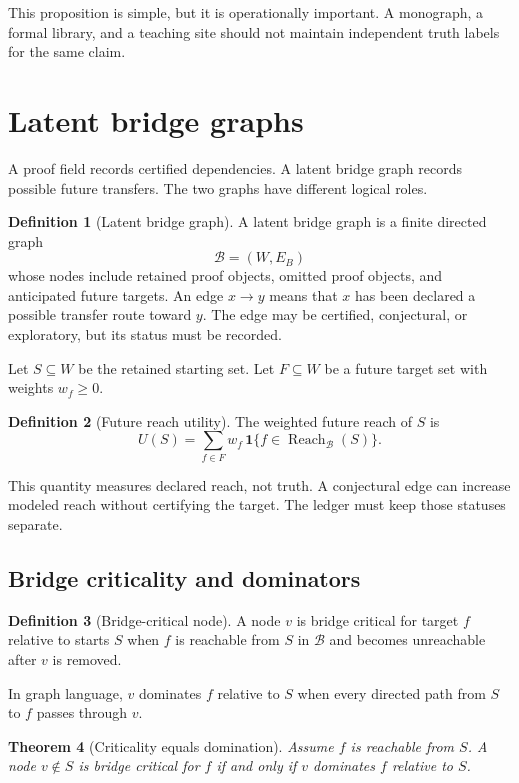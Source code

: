 \documentclass[11pt,oneside]{article}
\newtheorem{theorem}{Theorem}[section]
\theoremstyle{definition}
\newtheorem{definition}[theorem]{Definition}
\theoremstyle{remark}
\newcommand{\Bcal}{\mathcal B}
\newcommand{\Reach}{\operatorname{Reach}}
\begin{document}
This proposition is simple, but it is operationally important. A monograph, a formal library, and a teaching site should not maintain independent truth labels for the same claim.

\section{Latent bridge graphs}

A proof field records certified dependencies. A latent bridge graph records possible future transfers. The two graphs have different logical roles.

\begin{definition}[Latent bridge graph]
A latent bridge graph is a finite directed graph
\[
\Bcal=(W,E_B)
\]
whose nodes include retained proof objects, omitted proof objects, and anticipated future targets. An edge $x\to y$ means that $x$ has been declared a possible transfer route toward $y$. The edge may be certified, conjectural, or exploratory, but its status must be recorded.
\end{definition}

Let $S\subseteq W$ be the retained starting set. Let $F\subseteq W$ be a future target set with weights $w_f\ge0$.

\begin{definition}[Future reach utility]
The weighted future reach of $S$ is
\[
U(S)=\sum_{f\in F}w_f\,
\mathbf 1\{f\in\Reach_{\Bcal}(S)\}.
\]
\end{definition}

This quantity measures declared reach, not truth. A conjectural edge can increase modeled reach without certifying the target. The ledger must keep those statuses separate.

\subsection{Bridge criticality and dominators}

\begin{definition}[Bridge-critical node]
A node $v$ is bridge critical for target $f$ relative to starts $S$ when $f$ is reachable from $S$ in $\Bcal$ and becomes unreachable after $v$ is removed.
\end{definition}

In graph language, $v$ dominates $f$ relative to $S$ when every directed path from $S$ to $f$ passes through $v$.

\begin{theorem}[Criticality equals domination]
Assume $f$ is reachable from $S$. A node $v\notin S$ is bridge critical for $f$ if and only if $v$ dominates $f$ relative to $S$.
\end{theorem}
\end{document}
